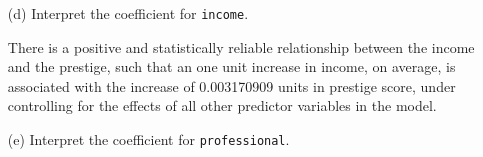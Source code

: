 \documentclass[12pt,letterpaper]{article}
\begin{document}
\begin{enumerate}
	\noindent \textbf The formula of prediction equation is: \vspace{0.5cm}
			

$$ \hat{y} = \hat{\beta_0} + \hat{\beta_1} \times  \text{income} +  \hat{\beta_2} \times  \text{professional} + 
\hat{\beta_3} \times  \text{income} \times \text{professional}\\ $$		

	
	\noindent \textbf Getting the coefficients for writing the prediction equation. 
	\vspace{0.5cm}
	

	  
	\vspace{.25cm}
	
		\noindent \textbf{Output: }
\begin{verbatim}
(Intercept)              income        professional income:professional        
21.142258854         0.003170909        37.781279955        -0.002325709 
\end{verbatim}  
\vspace{.25cm}

\noindent \textbf Writing the prediction equation. 
\vspace{0.5cm}		


  
\vspace{.25cm}
	
	\noindent \textbf{Output: }
	\begin{verbatim}
Prediction Equation:
prestige = 21.14226 + 0.003170909 * income + 37.78128 * professionals + 
( -0.002325709 ) * income:professionals
		
	\end{verbatim}  
	\vspace{0.5 cm}
	

	\item [(d)]
	Interpret the coefficient for \texttt{income}.
		
	\noindent  There is a positive and statistically reliable relationship between the income and the prestige, such that an one unit increase in income, on average, is associated with the increase of 0.003170909 units in prestige score, under controlling for the effects of all other predictor variables in the model.
	\vspace{1 cm}

	\item [(e)]
	Interpret the coefficient for \texttt{professional}.
	

\end{enumerate}
\end{document}
